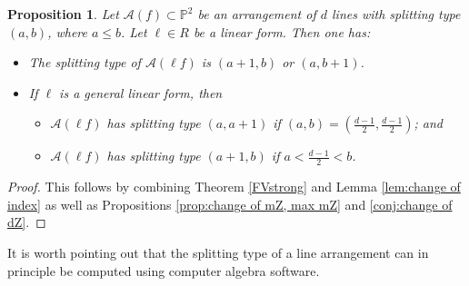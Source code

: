 \documentclass[12pt]{amsart}
\numberwithin{equation}{section}
\newtheorem{proposition}[theorem]{Proposition}
\theoremstyle{definition}
\begin{document}
\begin{proposition} 
  \label{prop:change of splitting type}
Let ${\mathcal A}(f) \subset { \ensuremath{\mathbb{P}}}^2$ be an arrangement of $d$ lines with splitting type $(a, b)$, where $a \le b$.  Let $\ell \in R$ be a linear form. Then one has: 
\begin{itemize}
\item[(a)] The splitting type of ${\mathcal{A}} (\ell f)$ is $(a+1, b)$ or $(a, b+1)$. 

\item[(b)] If $\ell$ is a general linear form, then 
\begin{itemize}
\item  ${\mathcal A} (\ell  f)$ has splitting type $(a, a+1)$ if  $(a, b) = (\frac{d-1}{2}, \frac{d-1}{2})$; \; and 

\item  ${\mathcal A} (\ell f)$ has splitting type $(a + 1, b)$ if  $a < \frac{d-1}{2} < b$. 
\end{itemize} 
\end{itemize} 
\end{proposition}

\begin{proof}
This follows by combining Theorem \ref{FVstrong} and Lemma \ref{lem:change of index} as well as Propositions \ref{prop:change of mZ, max mZ} and \ref{conj:change of dZ}.  \end{proof}

It is worth pointing out  that the splitting type  of a line arrangement can in principle be computed using computer algebra software. 
\end{document}
